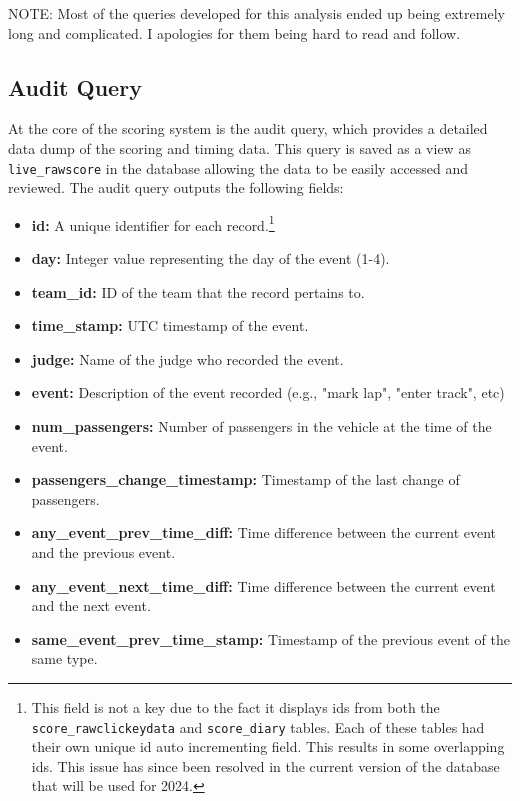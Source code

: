 \documentclass[11pt]{article}
\begin{document}
\noindent
NOTE: Most of the queries developed for this analysis ended up being extremely long and complicated. I apologies for them being hard to read and follow.

\pagebreak
\subsection{Audit Query}
\label{sec:audit_query}

At the core of the scoring system is the audit query, which provides a detailed data dump of the scoring and timing data. This query is saved as a view as \texttt{live\_rawscore} in the database allowing the data to be easily accessed and reviewed. The audit query outputs the following fields:

\begin{itemize}
    \item \textbf{id:} A unique identifier for each record.\footnote{This field is not a key due to the fact it displays ids from both the \texttt{score\_rawclickeydata} and \texttt{score\_diary} tables. Each of these tables had their own unique id auto incrementing field. This results in some overlapping ids. This issue has since been resolved in the current version of the database that will be used for 2024.}
    \item \textbf{day:} Integer value representing the day of the event (1-4).
    \item \textbf{team\_id:} ID of the team that the record pertains to.
    \item \textbf{time\_stamp:} UTC timestamp of the event.
    \item \textbf{judge:} Name of the judge who recorded the event.
    \item \textbf{event:} Description of the event recorded (e.g., "mark lap", "enter track", etc)
    \item \textbf{num\_passengers:} Number of passengers in the vehicle at the time of the event.
    \item \textbf{passengers\_change\_timestamp:} Timestamp of the last change of passengers.
    \item \textbf{any\_event\_prev\_time\_diff:} Time difference between the current event and the previous event.
    \item \textbf{any\_event\_next\_time\_diff:} Time difference between the current event and the next event.
    \item \textbf{same\_event\_prev\_time\_stamp:} Timestamp of the previous event of the same type.

\end{itemize}
\end{document}
